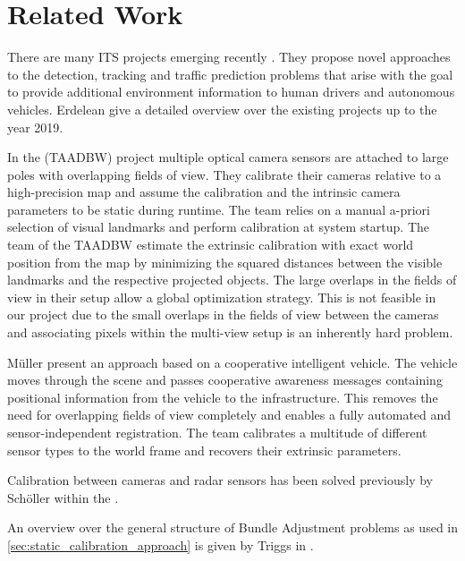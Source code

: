 \section{Related Work}
There are many ITS projects emerging recently  \cite{koster2017testfeld,arnold2020cooperative,arnoldCooperativePerception,agrawal2008censure}. 
They propose novel approaches to the detection, tracking and traffic prediction problems that arise with the goal to provide additional environment information to human drivers and autonomous vehicles.
Erdelean \etal{} \cite{erdelean2019catalogue} give a detailed overview over the existing projects up to the year 2019.

In the \TAADBW{} (TAADBW) project multiple optical camera sensors are attached to large poles with overlapping fields of view.
They calibrate their cameras relative to a high-precision map and assume the calibration and the intrinsic camera parameters to be static during runtime. 
The team relies on a manual a-priori selection of visual landmarks and perform calibration at system startup.  
The team of the TAADBW estimate the extrinsic calibration with exact world position from the map by minimizing the squared distances between the visible landmarks and the respective projected objects.
The large overlaps in the fields of view in their setup allow a global optimization strategy. 
This is not feasible in our project due to the small overlaps in the fields of view between the cameras \cite{kraemmer2020providentia} and associating pixels within the multi-view setup is an inherently hard problem. 

Müller \etal{} \cite{laciMueller} present an approach based on a cooperative intelligent vehicle.
The vehicle moves through the scene and passes cooperative awareness messages containing positional information from the vehicle to the infrastructure. 
This removes the need for overlapping fields of view completely and enables a fully automated and sensor-independent registration.
The team calibrates a multitude of different sensor types to the world frame and recovers their extrinsic parameters. 

Calibration between cameras and radar sensors has been solved previously by Schöller \etal{} within the \Providentia{}.

An overview over the general structure of Bundle Adjustment problems as used in \autoref{sec:static_calibration_approach} is given by Triggs \etal{} in \cite{triggs10.1007/3-540-44480-7_21}.
